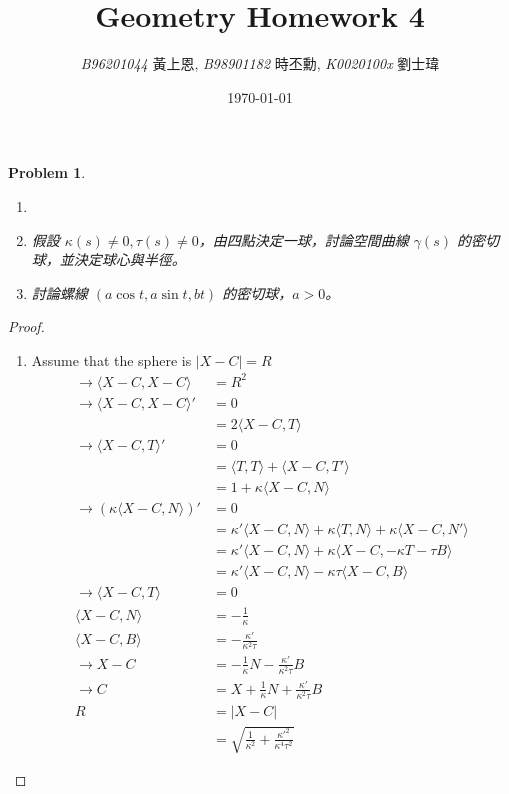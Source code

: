 \documentclass[10pt,a4paper]{article}
\newcommand{\LiHei}{\CJKfamily{lh}}
\newcounter{theProblemCounter}
\newtheorem{problem}[theProblemCounter]{Problem}
\begin{document}
\title{{Geometry Homework 4}}
\author{{\it{B96201044}} {\LiHei 黃上恩}, {\it{B98901182}} {\LiHei 時丕勳}, {\it{K0020100x}} {\LiHei 劉士瑋}}
\date{\today}
\maketitle

\setcounter{theProblemCounter}{2}
\begin{problem}
\begin{enumerate}
\item[]
\item[(a)] 假設 $\kappa(s)\ne 0, \tau(s)\ne 0$，由四點決定一球，討論空間曲線 $\gamma(s)$ 的密切球，並決定球心與半徑。
\item[(b)] 討論螺線 $(a\cos t, a\sin t, bt)$ 的密切球，$a>0$。
\end{enumerate}
\end{problem}
\begin{proof}
\begin{enumerate}
\item[(a)] Assume that the sphere is $\left|X-C\right| = R$
\begin{align*}
\rightarrow \langle X-C,X-C\rangle &= R^2\\
\rightarrow \langle X-C,X-C\rangle' &= 0\\
&= 2\langle X-C,T\rangle\\
\rightarrow \langle X-C,T\rangle' &= 0\\
&=\langle T,T\rangle+\langle X-C,T'\rangle\\
&=1+\kappa \langle X-C,N\rangle\\
\rightarrow \left(\kappa\langle X-C,N\rangle\right)'&=0\\
&=\kappa'\langle X-C,N\rangle+\kappa\langle T,N\rangle+\kappa\langle X-C,N'\rangle\\
&=\kappa'\langle X-C,N\rangle+\kappa\langle X-C,-\kappa T-\tau B\rangle\\
&=\kappa'\langle X-C,N\rangle-\kappa\tau\langle X-C,B\rangle\\
\rightarrow \langle X-C,T\rangle&=0\\
\langle X-C,N\rangle&=-\frac{1}{\kappa}\\
\langle X-C,B\rangle&=-\frac{\kappa'}{\kappa^2\tau}\\
\rightarrow X-C&=-\frac{1}{\kappa}N-\frac{\kappa'}{\kappa^2\tau}B\\
\rightarrow C&=X+\frac{1}{\kappa}N+\frac{\kappa'}{\kappa^2\tau}B\\
R&=\left|X-C\right|\\
&=\sqrt{\frac{1}{\kappa^2}+\frac{\kappa'^2}{\kappa^4\tau^2}}
\end{align*}
\end{enumerate}
\end{proof}
\end{document}
